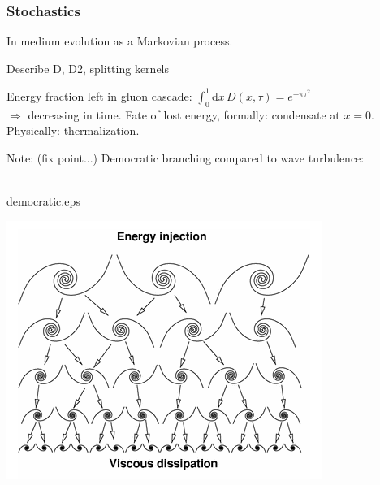 \documentclass[pstricks,mathserif]{beamer}
\begin{document}
\begin{frame}
\frametitle{Stochastics}
In medium evolution as a Markovian process.


Describe D, D2, splitting kernels
\end{frame}



\begin{frame}

Energy fraction left in gluon cascade: $\int_0^1 \mathrm{d}x\, D(x,\tau) = e^{-\pi\tau^2}$\\ $\Rightarrow$ decreasing in time. Fate of lost energy, formally: condensate at $x=0$. Physically: thermalization.

\vspace*{1cm}
Note: (fix point...)
Democratic branching compared to wave turbulence:\\
~\\

{\tiny
{}
	\centering
	\begin{overpic}[width=0.7\linewidth]{democratic.eps}
	\end{overpic}
\endminipage\hfill
{}
	\centering
  	\includegraphics[width=0.7\linewidth]{Richardson_cascade.png}
\endminipage\hfill
}


\end{frame}
\end{document}
